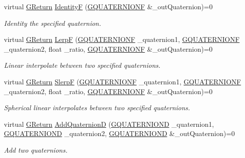 \begin{DoxyCompactItemize}
virtual \hyperlink{namespaceGW_a67a839e3df7ea8a5c5686613a7a3de21}{G\+Return} \hyperlink{classGW_1_1MATH_1_1GQuaternion_a4aac4b3d58d3f7ceb2c53c6651ccd15e}{IdentityF} (\hyperlink{structGW_1_1MATH_1_1GQUATERNIONF}{G\+Q\+U\+A\+T\+E\+R\+N\+I\+O\+NF} \&\+\_\+out\+Quaternion)=0
\begin{DoxyCompactList}\small\item\em Identity the specified quaternion. \end{DoxyCompactList}\item 
virtual \hyperlink{namespaceGW_a67a839e3df7ea8a5c5686613a7a3de21}{G\+Return} \hyperlink{classGW_1_1MATH_1_1GQuaternion_a1de2282e65771089996872bc7e90ade0}{LerpF} (\hyperlink{structGW_1_1MATH_1_1GQUATERNIONF}{G\+Q\+U\+A\+T\+E\+R\+N\+I\+O\+NF} \+\_\+quaternion1, \hyperlink{structGW_1_1MATH_1_1GQUATERNIONF}{G\+Q\+U\+A\+T\+E\+R\+N\+I\+O\+NF} \+\_\+quaternion2, float \+\_\+ratio, \hyperlink{structGW_1_1MATH_1_1GQUATERNIONF}{G\+Q\+U\+A\+T\+E\+R\+N\+I\+O\+NF} \&\+\_\+out\+Quaternion)=0
\begin{DoxyCompactList}\small\item\em Linear interpolate between two specified quaternions. \end{DoxyCompactList}\item 
virtual \hyperlink{namespaceGW_a67a839e3df7ea8a5c5686613a7a3de21}{G\+Return} \hyperlink{classGW_1_1MATH_1_1GQuaternion_a1dc2330222c0a78796629503847a67c7}{SlerpF} (\hyperlink{structGW_1_1MATH_1_1GQUATERNIONF}{G\+Q\+U\+A\+T\+E\+R\+N\+I\+O\+NF} \+\_\+quaternion1, \hyperlink{structGW_1_1MATH_1_1GQUATERNIONF}{G\+Q\+U\+A\+T\+E\+R\+N\+I\+O\+NF} \+\_\+quaternion2, float \+\_\+ratio, \hyperlink{structGW_1_1MATH_1_1GQUATERNIONF}{G\+Q\+U\+A\+T\+E\+R\+N\+I\+O\+NF} \&\+\_\+out\+Quaternion)=0
\begin{DoxyCompactList}\small\item\em Spherical linear interpolates between two specified quaternions. \end{DoxyCompactList}\item 
virtual \hyperlink{namespaceGW_a67a839e3df7ea8a5c5686613a7a3de21}{G\+Return} \hyperlink{classGW_1_1MATH_1_1GQuaternion_a7b2b661a82bd6370567ab2a31c463cea}{Add\+QuaternionD} (\hyperlink{structGW_1_1MATH_1_1GQUATERNIOND}{G\+Q\+U\+A\+T\+E\+R\+N\+I\+O\+ND} \+\_\+quaternion1, \hyperlink{structGW_1_1MATH_1_1GQUATERNIOND}{G\+Q\+U\+A\+T\+E\+R\+N\+I\+O\+ND} \+\_\+quaternion2, \hyperlink{structGW_1_1MATH_1_1GQUATERNIOND}{G\+Q\+U\+A\+T\+E\+R\+N\+I\+O\+ND} \&\+\_\+out\+Quaternion)=0
\begin{DoxyCompactList}\small\item\em Add two quaternions. \end{DoxyCompactList}\item 

\end{DoxyCompactItemize}
